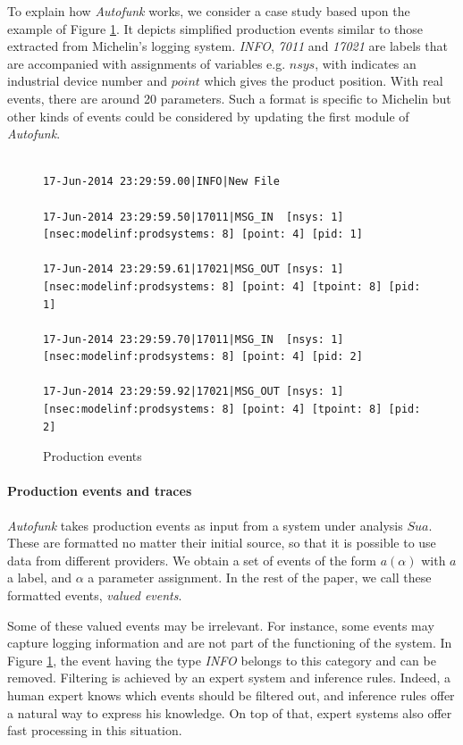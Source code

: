 To explain how \textit{Autofunk} works, we consider a case study
based upon the example of Figure \ref{fig:rawdatum}. It depicts
simplified production events similar to those extracted from
Michelin's logging system. \textit{INFO}, \textit{7011} and
\textit{17021} are labels that are accompanied with assignments
of variables e.g. $nsys$, with indicates an industrial device
number and $point$ which gives the product position. With real
events, there are around 20 parameters. Such a format is specific
to Michelin but other kinds of events could be considered by
updating the first module of \textit{Autofunk}.\\\\

\begin{figure}
\begin{lstlisting}
17-Jun-2014 23:29:59.00|INFO|New File

17-Jun-2014 23:29:59.50|17011|MSG_IN  [nsys: 1] [nsec:modelinf:prodsystems: 8] [point: 4] [pid: 1]

17-Jun-2014 23:29:59.61|17021|MSG_OUT [nsys: 1] [nsec:modelinf:prodsystems: 8] [point: 4] [tpoint: 8] [pid: 1]

17-Jun-2014 23:29:59.70|17011|MSG_IN  [nsys: 1] [nsec:modelinf:prodsystems: 8] [point: 4] [pid: 2]

17-Jun-2014 23:29:59.92|17021|MSG_OUT [nsys: 1] [nsec:modelinf:prodsystems: 8] [point: 4] [tpoint: 8] [pid: 2]
\end{lstlisting}

    \caption{Production events}
    \label{fig:rawdatum}
\end{figure}

\paragraph{Production events and traces}
\label{part2:collecting}

\textit{Autofunk} takes production events as input from a system
under analysis $Sua$. These are formatted no matter their initial
source, so that it is possible to use data from different
providers. We obtain a set of events of the form $a(\alpha)$ with
$a$ a label, and $\alpha$ a parameter assignment. In the rest of
the paper, we call these formatted events, \textit{valued events}.

Some of these valued events may be irrelevant. For instance, some
events may capture logging information and are not part of
the functioning of the system. In Figure \ref{fig:rawdatum}, the
event having the type \textit{INFO} belongs to this category
and can be removed. Filtering is achieved by an expert system
and inference rules. Indeed, a human expert knows which events
should be filtered out, and inference rules offer a natural way
to express his knowledge. On top of that, expert systems also
offer fast processing in this situation.

